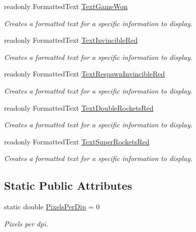 \begin{DoxyCompactItemize}
readonly Formatted\+Text \mbox{\hyperlink{class_o_e_invaders_1_1_library_1_1_text_storage_aa1394b454473311d7fe7503b8740d7f0}{Text\+Game\+Won}}
\begin{DoxyCompactList}\small\item\em Creates a formatted text for a specific information to display. \end{DoxyCompactList}\item 
readonly Formatted\+Text \mbox{\hyperlink{class_o_e_invaders_1_1_library_1_1_text_storage_ae7b607827f59e14a374abad685a883f8}{Text\+Invincible\+Red}}
\begin{DoxyCompactList}\small\item\em Creates a formatted text for a specific information to display. \end{DoxyCompactList}\item 
readonly Formatted\+Text \mbox{\hyperlink{class_o_e_invaders_1_1_library_1_1_text_storage_a27345eea6221e5485b0001e0f6e0ebee}{Text\+Respawn\+Invincible\+Red}}
\begin{DoxyCompactList}\small\item\em Creates a formatted text for a specific information to display. \end{DoxyCompactList}\item 
readonly Formatted\+Text \mbox{\hyperlink{class_o_e_invaders_1_1_library_1_1_text_storage_a9686586d4689efa109bea57f2de308f7}{Text\+Double\+Rockets\+Red}}
\begin{DoxyCompactList}\small\item\em Creates a formatted text for a specific information to display. \end{DoxyCompactList}\item 
readonly Formatted\+Text \mbox{\hyperlink{class_o_e_invaders_1_1_library_1_1_text_storage_ad37234c92473fe03121a128603a81f6a}{Text\+Super\+Rockets\+Red}}
\begin{DoxyCompactList}\small\item\em Creates a formatted text for a specific information to display. \end{DoxyCompactList}\end{DoxyCompactItemize}
\subsection*{Static Public Attributes}
\begin{DoxyCompactItemize}
\item 
static double \mbox{\hyperlink{class_o_e_invaders_1_1_library_1_1_text_storage_a710192842e0a35b2de1a00bc1f3b4856}{Pixels\+Per\+Dip}} = 0
\begin{DoxyCompactList}\small\item\em Pixels per dpi. \end{DoxyCompactList}\end{DoxyCompactItemize}



